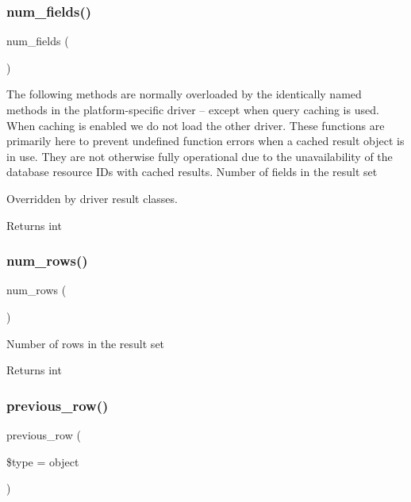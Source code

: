 \subsubsection{\texorpdfstring{num\+\_\+fields()}{num\_fields()}}
{\footnotesize\ttfamily num\+\_\+fields (\begin{DoxyParamCaption}{ }\end{DoxyParamCaption})}

The following methods are normally overloaded by the identically named methods in the platform-\/specific driver -- except when query caching is used. When caching is enabled we do not load the other driver. These functions are primarily here to prevent undefined function errors when a cached result object is in use. They are not otherwise fully operational due to the unavailability of the database resource I\+Ds with cached results. Number of fields in the result set

Overridden by driver result classes.

\begin{DoxyReturn}{Returns}
int 
\end{DoxyReturn}
\mbox{\label{class_c_i___d_b__result_a218657c303ee499b97710ab0cd2f5d6e}} 
\subsubsection{\texorpdfstring{num\+\_\+rows()}{num\_rows()}}
{\footnotesize\ttfamily num\+\_\+rows (\begin{DoxyParamCaption}{ }\end{DoxyParamCaption})}

Number of rows in the result set

\begin{DoxyReturn}{Returns}
int 
\end{DoxyReturn}
\mbox{\label{class_c_i___d_b__result_a458567a19d160a814b41b2964ec192ce}} 
\subsubsection{\texorpdfstring{previous\+\_\+row()}{previous\_row()}}
{\footnotesize\ttfamily previous\+\_\+row (\begin{DoxyParamCaption}\item[{}]{\$type = {\ttfamily \textquotesingle{}object\textquotesingle{}} }\end{DoxyParamCaption})}

